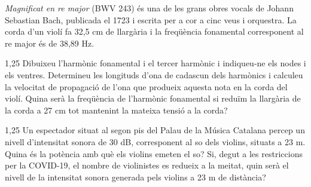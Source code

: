 \textit{Magnificat en re major} (BWV 243) és una de les grans obres vocals de Johann
Sebastian Bach, publicada el 1723 i escrita per a cor a cinc veus i orquestra. La corda
d'un violí fa 32,5 cm de llargària i la freqüència fonamental corresponent al re major és
de 38,89 Hz.

\begin{apartat}{1,25}
Dibuixeu l'harmònic fonamental i el tercer harmònic i indiqueu-ne els nodes i els ventres.
Determineu les longituds d'ona de cadascun dels harmònics i calculeu la velocitat de
propagació de l'ona que produeix aquesta nota en la corda del violí. Quina serà la
freqüència de l'harmònic fonamental si reduïm la llargària de la corda a 27 cm tot
mantenint la mateixa tensió a la corda?
\end{apartat}

\begin{apartat}{1,25}
Un espectador situat al segon pis del Palau de la Música Catalana percep un nivell
d'intensitat sonora de 30 dB, corresponent al so dels violins, situats a 23 m. Quina és la
potència amb què els violins emeten el so? Si, degut a les restriccions per la COVID-19,
el nombre de violinistes es redueix a la meitat, quin serà el nivell de la intensitat
sonora generada pels violins a 23 m de distància?
\end{apartat}


